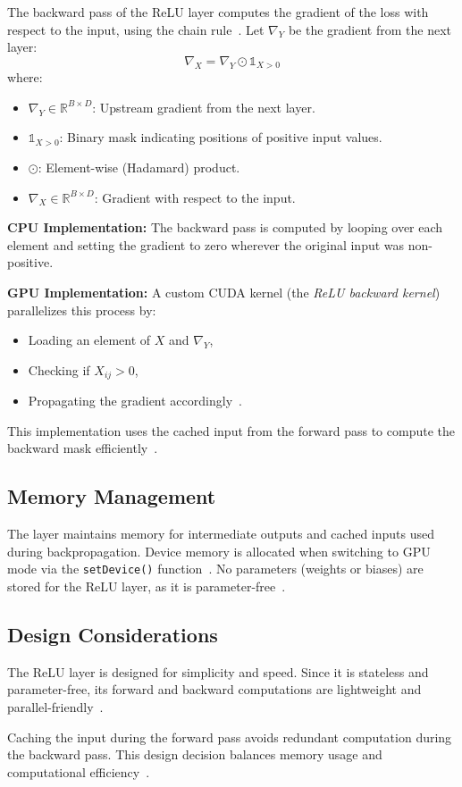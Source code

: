 The backward pass of the ReLU layer computes the gradient of the loss with respect to the input, using the chain rule~\cite{goodfellow2016deep}. Let \( \nabla_Y \) be the gradient from the next layer:
\[
    \nabla_X = \nabla_Y \odot \mathbb{1}_{X > 0}
\]
where:
\begin{itemize}
    \item \( \nabla_Y \in \mathbb{R}^{B \times D} \): Upstream gradient from the next layer.
    \item \( \mathbb{1}_{X > 0} \): Binary mask indicating positions of positive input values.
    \item \( \odot \): Element-wise (Hadamard) product.
    \item \( \nabla_X \in \mathbb{R}^{B \times D} \): Gradient with respect to the input.
\end{itemize}

\textbf{CPU Implementation:}  
The backward pass is computed by looping over each element and setting the gradient to zero wherever the original input was non-positive.

\textbf{GPU Implementation:}  
A custom CUDA kernel (the \textit{ReLU backward kernel}) parallelizes this process by:
\begin{itemize}
    \item Loading an element of \( X \) and \( \nabla_Y \),
    \item Checking if \( X_{ij} > 0 \),
    \item Propagating the gradient accordingly~\cite{nvidia_cudnn}.
\end{itemize}

This implementation uses the cached input from the forward pass to compute the backward mask efficiently~\cite{neptune_gpu_optimization}.

\subsection{Memory Management}

The layer maintains memory for intermediate outputs and cached inputs used during backpropagation. Device memory is allocated when switching to GPU mode via the \texttt{setDevice()} function~\cite{nvidia_cudnn}. No parameters (weights or biases) are stored for the ReLU layer, as it is parameter-free~\cite{goodfellow2016deep}.

\subsection{Design Considerations}

The ReLU layer is designed for simplicity and speed. Since it is stateless and parameter-free, its forward and backward computations are lightweight and parallel-friendly~\cite{nair2010rectified, goodfellow2016deep}.

Caching the input during the forward pass avoids redundant computation during the backward pass. This design decision balances memory usage and computational efficiency~\cite{aws_gpu_performance}.
